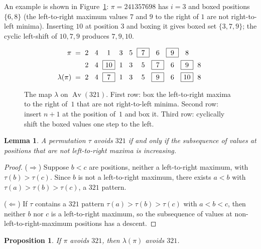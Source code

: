 \documentclass[a4paper,11pt]{article}
\newtheorem{lemma}[theorem]{Lemma}
\newtheorem{proposition}[theorem]{Proposition}
\theoremstyle{definition}
\DeclareMathOperator{\Av}{Av}
\newcommand{\bx}[1]{\boxed{\makebox[1.1em]{$#1$}}}
\newcommand{\ub}[1]{\vphantom{\bx{0}}\makebox[1.1em]{$#1$}}
\begin{document}
An example is shown in
Figure~\ref{fig:321-lambda}: $\pi = 241357698$ has
$i = 3$ and boxed positions $\{6, 8\}$ (the
left-to-right maximum values $7$ and $9$ to the right
of $1$ are not right-to-left minima). Inserting $10$
at position $3$ and boxing it gives boxed set
$\{3, 7, 9\}$; the cyclic left-shift of $10, 7, 9$
produces $7, 9, 10$.

\begin{figure}[ht]
\centering
\[
\arraycolsep=1.5pt
\begin{array}{r*{10}{c}}
\pi \;= & \ub{2} & \ub{4} & \ub{1} & \ub{3} & \ub{5}
  & \bx{7} & \ub{6} & \bx{9} & \ub{8} & \\[4pt]
  & \ub{2} & \ub{4} & \bx{10} & \ub{1} & \ub{3}
  & \ub{5} & \bx{7} & \ub{6} & \bx{9} & \ub{8} \\[4pt]
\lambda(\pi) \;= & \ub{2} & \ub{4} & \bx{7} & \ub{1}
  & \ub{3} & \ub{5} & \bx{9} & \ub{6} & \bx{10}
  & \ub{8}
\end{array}
\]
\caption{The map $\lambda$ on $\Av(321)$. First row:
box the left-to-right maxima to the right of~$1$ that
are not right-to-left minima. Second row: insert
$n{+}1$ at the position of~$1$ and box it. Third row:
cyclically shift the boxed values one step to the
left.}
\label{fig:321-lambda}
\end{figure}

\begin{lemma}\label{lem:321-nonlmax}
A permutation $\tau$ avoids $321$ if and only if the
subsequence of values at positions that are not
left-to-right maxima is increasing.
\end{lemma}

\begin{proof}
($\Rightarrow$) Suppose $b < c$ are positions, neither
a left-to-right maximum, with $\tau(b) > \tau(c)$.
Since $b$ is not a left-to-right maximum, there exists
$a < b$ with $\tau(a) > \tau(b) > \tau(c)$, a $321$
pattern.

($\Leftarrow$) If $\tau$ contains a $321$ pattern
$\tau(a) > \tau(b) > \tau(c)$ with $a < b < c$, then
neither $b$ nor $c$ is a left-to-right maximum,
so the subsequence of values
at non-left-to-right-maximum positions has a descent.
\end{proof}

\begin{proposition}\label{prop:321-closure}
If $\pi$ avoids $321$, then $\lambda(\pi)$ avoids $321$.
\end{proposition}
\end{document}

